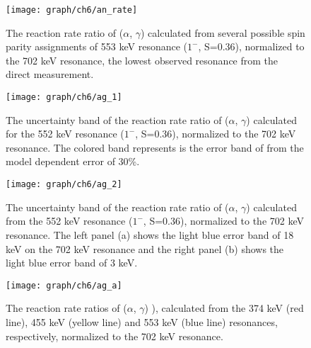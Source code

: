 \begin{figure}[tpb]
  \begin{center}
    \centerline{\texttt{[image: graph/ch6/an\_rate]}}
    \caption{The reaction rate ratio of ($\alpha$, $\gamma$) calculated from several possible spin parity assignments of 553 keV resonance ($1^-$, S=0.36), normalized to the 702 keV resonance, the lowest observed resonance from the direct measurement.}
    \label{fg:rate1}
  \end{center}
\end{figure}




\begin{figure}[tpb]
  \begin{center}
    \centerline{\texttt{[image: graph/ch6/ag\_1]}}
    \caption{The uncertainty band  of the reaction rate ratio of ($\alpha$, $\gamma$)   calculated for the 552 keV resonance ($1^-$, S=0.36), normalized to the 702 keV resonance. The colored band represents is the error band of from the model dependent error of  30\%.}
    \label{fg:ag_1}
  \end{center}
\end{figure}


\begin{figure}[tpb]
  \begin{center}
    \centerline{\texttt{[image: graph/ch6/ag\_2]}}
    \caption{The uncertainty band  of the reaction rate ratio of ($\alpha$, $\gamma$)   calculated from the 552 keV resonance ($1^-$, S=0.36), normalized to the 702 keV resonance.  The left panel (a) shows the light blue error band of 18 keV on the 702 keV resonance and the right panel (b) shows the light blue error band of 3 keV. }
    \label{fg:ag_2}
  \end{center}
\end{figure}

\begin{figure}[tpb]
  \begin{center}
    \centerline{\texttt{[image: graph/ch6/ag\_a]}}
    \caption{The reaction rate ratios of  ($\alpha$, $\gamma$) ), calculated from the  374 keV (red line), 455 keV (yellow line) and 553 keV (blue line)  resonances, respectively, normalized to the 702 keV resonance.}
    \label{fg:ag_a}
  \end{center}
\end{figure}


%
% 
% 
